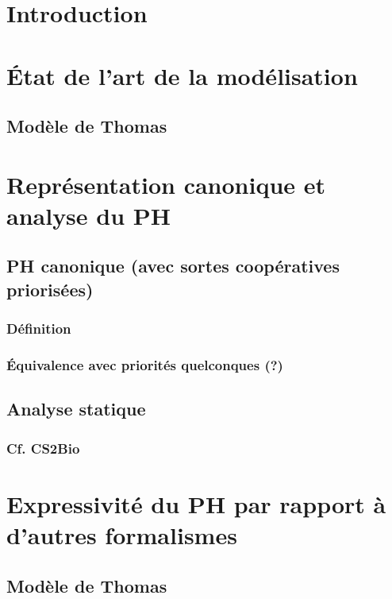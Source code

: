 \documentclass[a4paper]{report}
\begin{document}
\setcounter{tocdepth}{3}
\tableofcontents



\chapter{Introduction}



\chapter{État de l'art de la modélisation}
  \section{Modèle de Thomas}
  



\chapter{Représentation canonique et analyse du PH}
  \section{PH canonique (avec sortes coopératives priorisées)}
    \subsection{Définition}
    \subsection{Équivalence avec priorités quelconques (?)}
  \section{Analyse statique}
    \subsection{Cf. CS2Bio}

\chapter{Expressivité du PH par rapport à d'autres formalismes}
  \section{Modèle de Thomas}
\end{document}
